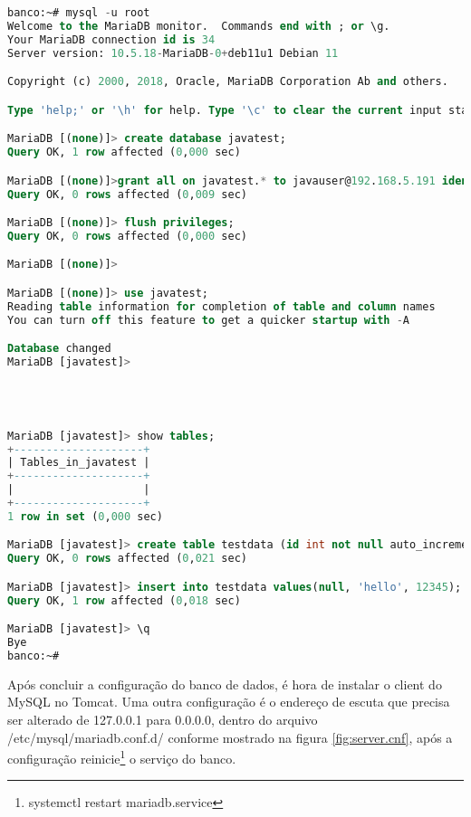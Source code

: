 \hypertarget{criandobancodados}{}
\begin{lstlisting}[language=sql,breaklines=true,basicstyle=\ttfamily, 
label=criandobancodados0 ,
breaklines=true,caption=\firacoderetina Criar banco e tabelas, 
postbreak=\mbox{\textcolor{red}{$\hookrightarrow$}\space},
showstringspaces=false]
banco:~# mysql -u root
Welcome to the MariaDB monitor.  Commands end with ; or \g.
Your MariaDB connection id is 34
Server version: 10.5.18-MariaDB-0+deb11u1 Debian 11

Copyright (c) 2000, 2018, Oracle, MariaDB Corporation Ab and others.

Type 'help;' or '\h' for help. Type '\c' to clear the current input statement.

MariaDB [(none)]> create database javatest;
Query OK, 1 row affected (0,000 sec)

MariaDB [(none)]>grant all on javatest.* to javauser@192.168.5.191 identified by 'javadude';
Query OK, 0 rows affected (0,009 sec)

MariaDB [(none)]> flush privileges;
Query OK, 0 rows affected (0,000 sec)

MariaDB [(none)]> 

MariaDB [(none)]> use javatest;
Reading table information for completion of table and column names
You can turn off this feature to get a quicker startup with -A

Database changed
MariaDB [javatest]>




MariaDB [javatest]> show tables;
+--------------------+
| Tables_in_javatest |
+--------------------+
|                    |
+--------------------+
1 row in set (0,000 sec)

MariaDB [javatest]> create table testdata (id int not null auto_increment primary key,foo varchar(25),bar int);
Query OK, 0 rows affected (0,021 sec)

MariaDB [javatest]> insert into testdata values(null, 'hello', 12345);
Query OK, 1 row affected (0,018 sec)

MariaDB [javatest]> \q
Bye
banco:~#
\end{lstlisting}


Após concluir a configuração do banco de dados, é hora de instalar o client do MySQL no Tomcat. Uma outra configuração é o endereço de escuta que precisa ser alterado de 127.0.0.1 para 0.0.0.0, dentro do arquivo /etc/mysql/mariadb.conf.d/ conforme mostrado na figura \ref{fig:server.cnf}, após a configuração reinicie\footnote{systemctl restart mariadb.service} o serviço do banco.


